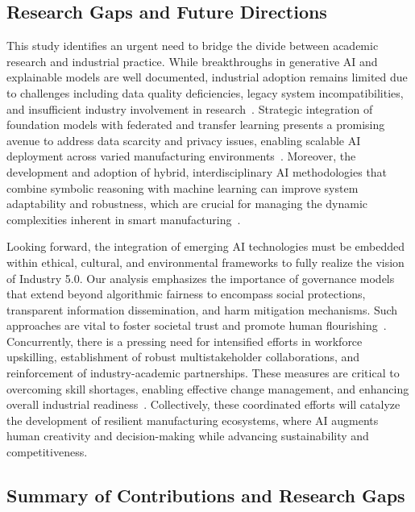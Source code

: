 \documentclass[sigconf]{acmart}
\begin{document}
\subsection{Research Gaps and Future Directions}

This study identifies an urgent need to bridge the divide between academic research and industrial practice. While breakthroughs in generative AI and explainable models are well documented, industrial adoption remains limited due to challenges including data quality deficiencies, legacy system incompatibilities, and insufficient industry involvement in research~\cite{ref3,ref7}. Strategic integration of foundation models with federated and transfer learning presents a promising avenue to address data scarcity and privacy issues, enabling scalable AI deployment across varied manufacturing environments~\cite{ref5,ref8}. Moreover, the development and adoption of hybrid, interdisciplinary AI methodologies that combine symbolic reasoning with machine learning can improve system adaptability and robustness, which are crucial for managing the dynamic complexities inherent in smart manufacturing~\cite{ref35,ref37}.

Looking forward, the integration of emerging AI technologies must be embedded within ethical, cultural, and environmental frameworks to fully realize the vision of Industry 5.0. Our analysis emphasizes the importance of governance models that extend beyond algorithmic fairness to encompass social protections, transparent information dissemination, and harm mitigation mechanisms. Such approaches are vital to foster societal trust and promote human flourishing~\cite{ref25}. Concurrently, there is a pressing need for intensified efforts in workforce upskilling, establishment of robust multistakeholder collaborations, and reinforcement of industry-academic partnerships. These measures are critical to overcoming skill shortages, enabling effective change management, and enhancing overall industrial readiness~\cite{ref2,ref3,ref21}. Collectively, these coordinated efforts will catalyze the development of resilient manufacturing ecosystems, where AI augments human creativity and decision-making while advancing sustainability and competitiveness.

\subsection{Summary of Contributions and Research Gaps}
\end{document}
